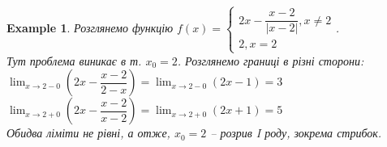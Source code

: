 \documentclass[a4paper, 14pt]{article}
\theoremstyle{theoremdd}
\theoremstyle{theoremdd}
\theoremstyle{theoremdd}
\theoremstyle{theoremdd}
\newtheorem{example}[theorem]{Example}
\theoremstyle{theoremdd}
\theoremstyle{theoremdd}
\theoremstyle{theoremdd}
\theoremstyle{theoremdd}
\begin{document}
\begin{example} Розглянемо функцію
$f(x) = \begin{cases} 
2x - \dfrac{x-2}{|x-2|}, x \neq 2 \\
2, x = 2
\end{cases}$.\\
Тут проблема виникає в т. $x_0 = 2$. Розглянемо границі в різні сторони:\\
$\displaystyle \lim_{x \to 2-0} \left(2x - \dfrac{x-2}{2-x}\right) = \lim_{x \to 2-0} (2x-1) = 3$\\
$\displaystyle \lim_{x \to 2+0} \left(2x - \dfrac{x-2}{x-2}\right) = \lim_{x \to 2+0} (2x+1) = 5$\\
Обидва ліміти не рівні, а отже, $x_0 = 2$ -- розрив I роду, зокрема стрибок.
\\ %
\end{example}
\end{document}
